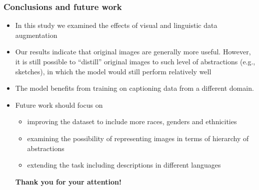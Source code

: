 \documentclass[aspectratio=1610]{beamer} %
\begin{document}
\begin{frame}
\frametitle{Conclusions and future work}
\begin{itemize}

\item In this study we examined the effects of visual and linguistic data augmentation
\item Our results indicate that original images are generally more useful. However, it is still possible to ``distill'' original images to such level of abstractions (e.g., sketches), in which the model would still perform relatively well
\item The model benefits from training on captioning data from a different domain.
\pause
\item Future work should focus on
\begin{itemize}
	\item improving the dataset to include more races, genders and ethnicities
	\item examining the possibility of representing images in terms of hierarchy of abstractions
	\item extending the task including descriptions in different languages
\end{itemize}

\pause
\textbf{Thank you for your attention!}

\end{itemize}
\end{frame}
\end{document}
